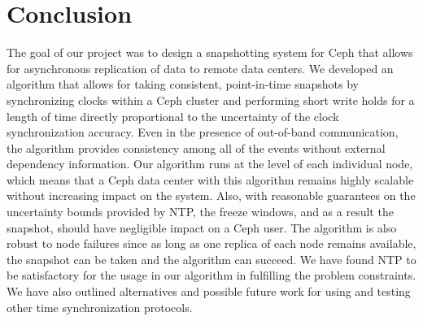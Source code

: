 \chapter{Conclusion}
\label{sec:conclusion}

The goal of our project was to design a snapshotting system for Ceph
that allows for asynchronous replication of data to remote data
centers.  We developed an algorithm that allows for taking 
consistent, point-in-time snapshots by synchronizing clocks within a
Ceph cluster and performing short write holds for a length of time
directly proportional to the uncertainty of the clock synchronization
accuracy.  Even in the presence of out-of-band communication, the
algorithm provides consistency among all of the events without
external dependency information. Our algorithm runs at the level of
each individual node, which means that a Ceph data center with this
algorithm remains highly scalable without increasing impact on the
system. Also, with reasonable guarantees on the uncertainty bounds
provided by NTP, the freeze windows, and as a result the snapshot,
should have negligible impact on a Ceph user. The algorithm is also
robust to node failures since as long as one replica of each node
remains available, the snapshot can be taken and the algorithm can
succeed. We have found NTP to be satisfactory for the usage in our
algorithm in fulfilling the problem constraints. We have also outlined
alternatives and possible future work for using and testing other time
synchronization protocols.
